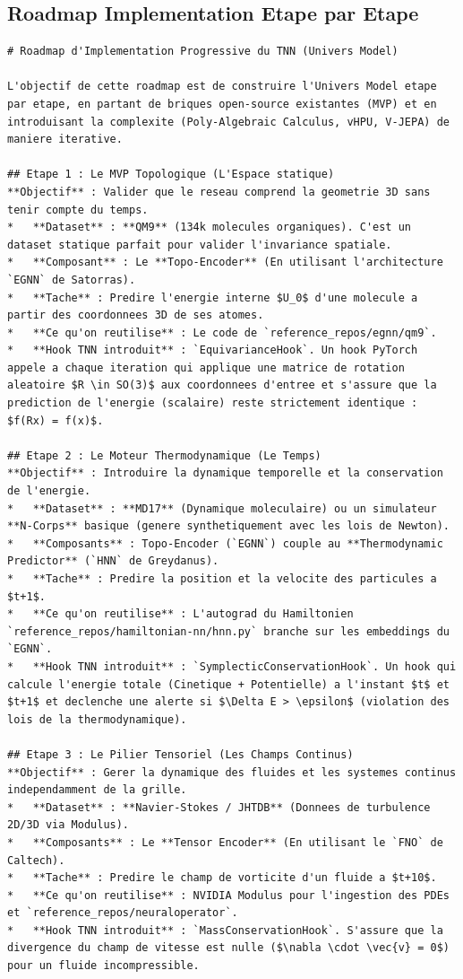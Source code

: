 \documentclass[11pt,a4paper]{article}
\begin{document}
\subsection{Roadmap Implementation Etape par Etape}
\begin{lstlisting}[language={}, caption={}, basicstyle=\ttfamily\footnotesize, breaklines=true]
# Roadmap d'Implementation Progressive du TNN (Univers Model)

L'objectif de cette roadmap est de construire l'Univers Model etape par etape, en partant de briques open-source existantes (MVP) et en introduisant la complexite (Poly-Algebraic Calculus, vHPU, V-JEPA) de maniere iterative.

## Etape 1 : Le MVP Topologique (L'Espace statique)
**Objectif** : Valider que le reseau comprend la geometrie 3D sans tenir compte du temps.
*   **Dataset** : **QM9** (134k molecules organiques). C'est un dataset statique parfait pour valider l'invariance spatiale.
*   **Composant** : Le **Topo-Encoder** (En utilisant l'architecture `EGNN` de Satorras).
*   **Tache** : Predire l'energie interne $U_0$ d'une molecule a partir des coordonnees 3D de ses atomes.
*   **Ce qu'on reutilise** : Le code de `reference_repos/egnn/qm9`.
*   **Hook TNN introduit** : `EquivarianceHook`. Un hook PyTorch appele a chaque iteration qui applique une matrice de rotation aleatoire $R \in SO(3)$ aux coordonnees d'entree et s'assure que la prediction de l'energie (scalaire) reste strictement identique : $f(Rx) = f(x)$.

## Etape 2 : Le Moteur Thermodynamique (Le Temps)
**Objectif** : Introduire la dynamique temporelle et la conservation de l'energie.
*   **Dataset** : **MD17** (Dynamique moleculaire) ou un simulateur **N-Corps** basique (genere synthetiquement avec les lois de Newton).
*   **Composants** : Topo-Encoder (`EGNN`) couple au **Thermodynamic Predictor** (`HNN` de Greydanus).
*   **Tache** : Predire la position et la velocite des particules a $t+1$.
*   **Ce qu'on reutilise** : L'autograd du Hamiltonien `reference_repos/hamiltonian-nn/hnn.py` branche sur les embeddings du `EGNN`.
*   **Hook TNN introduit** : `SymplecticConservationHook`. Un hook qui calcule l'energie totale (Cinetique + Potentielle) a l'instant $t$ et $t+1$ et declenche une alerte si $\Delta E > \epsilon$ (violation des lois de la thermodynamique).

## Etape 3 : Le Pilier Tensoriel (Les Champs Continus)
**Objectif** : Gerer la dynamique des fluides et les systemes continus independamment de la grille.
*   **Dataset** : **Navier-Stokes / JHTDB** (Donnees de turbulence 2D/3D via Modulus).
*   **Composants** : Le **Tensor Encoder** (En utilisant le `FNO` de Caltech).
*   **Tache** : Predire le champ de vorticite d'un fluide a $t+10$.
*   **Ce qu'on reutilise** : NVIDIA Modulus pour l'ingestion des PDEs et `reference_repos/neuraloperator`.
*   **Hook TNN introduit** : `MassConservationHook`. S'assure que la divergence du champ de vitesse est nulle ($\nabla \cdot \vec{v} = 0$) pour un fluide incompressible.


\end{lstlisting}
\end{document}
